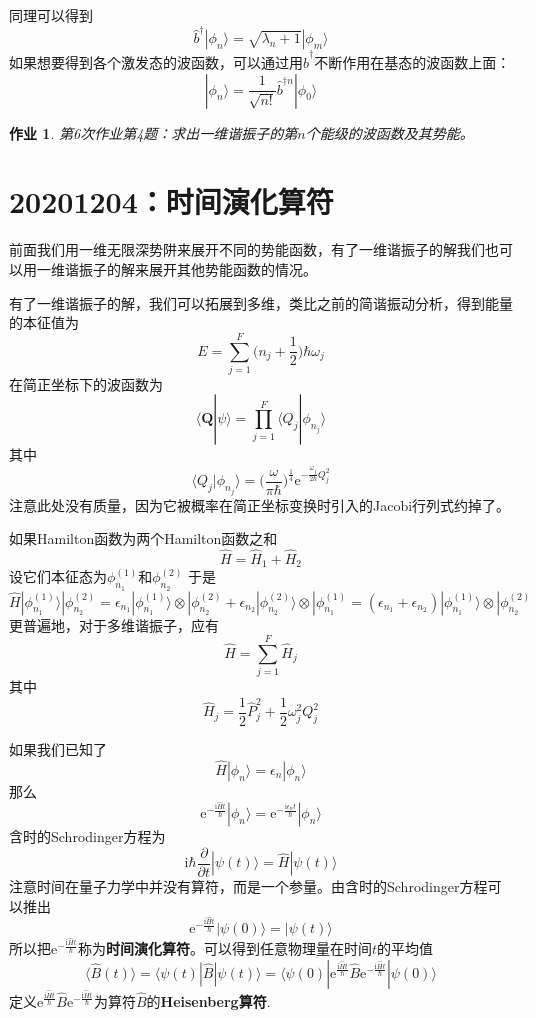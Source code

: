 \documentclass[12pt]{article}
\newtheorem{asg}{作业}
\begin{document}
    同理可以得到
    \[ \hat{b}^\dagger|\phi_n\rangle = \sqrt{\lambda_n+1}|\phi_m\rangle \]
    如果想要得到各个激发态的波函数，可以通过用$\hat{b}^\dagger$不断作用在基态的波函数上面：
    \[ |\phi_n \rangle = \frac 1{\sqrt{n!}} \hat{b}^{\dagger n} | \phi_0 \rangle \]

    \begin{asg}
        第6次作业第4题：求出一维谐振子的第$n$个能级的波函数及其势能。
    \end{asg}

\section{20201204：时间演化算符}

    前面我们用一维无限深势阱来展开不同的势能函数，有了一维谐振子的解我们也可以用一维谐振子的解来展开其他势能函数的情况。

    有了一维谐振子的解，我们可以拓展到多维，类比之前的简谐振动分析，得到能量的本征值为
    \[ E = \sum_{j=1}^F \bigg(n_j+\frac 12\bigg)\hbar \omega_j \]
    在简正坐标下的波函数为
    \[ \langle \bm{Q}|\psi \rangle = \prod_{j=1}^F \langle Q_j | \phi_{n_j} \rangle \]
    其中
    \[ \langle Q_j|\phi_{n_j} \rangle = \bigg(\frac {\omega}{\pi \hbar}\bigg)^{\frac 14} \mathrm{e}^{-\frac {\omega_j}{2\hbar} Q_j^2} \]
    注意此处没有质量，因为它被概率在简正坐标变换时引入的Jacobi行列式约掉了。

    如果Hamilton函数为两个Hamilton函数之和
    \[ \hat{H} = \hat{H}_1 + \hat{H}_2 \]
    设它们本征态为$\phi_{n_1}^{(1)}$和$\phi_{n_2}^{(2)}$
    于是
    \[\hat{H} |\phi_{n_1}^{(1)} \rangle |\phi_{n_2}^{(2)} = \epsilon_{n_1}|\phi_{n_1}^{(1)} \rangle \otimes |\phi_{n_2}^{(2)} + \epsilon_{n_2}|\phi_{n_2}^{(2)} \rangle \otimes |\phi_{n_1}^{(1)} = (\epsilon_{n_1}+\epsilon_{n_2})|\phi_{n_1}^{(1)} \rangle \otimes |\phi_{n_2}^{(2)}\]
    更普遍地，对于多维谐振子，应有
    \[ \hat{H} = \sum_{j=1}^F \hat{H}_j \]
    其中 
    \[ \hat{H}_j = \frac 12 \hat{P}_j^2 + \frac 12 \omega_j^2 Q_j^2 \]

    如果我们已知了
    \[ \hat{H}|\phi_n\rangle = \epsilon_n|\phi_n\rangle \]
    那么
    \[ \mathrm{e}^{-\frac {\mathrm{i}\hat{H}t}{\hbar}}|\phi_n\rangle = \mathrm{e}^{-\frac {\mathrm{i}\epsilon_n t}{\hbar}}|\phi_n\rangle \]
    含时的Schrodinger方程为
    \[ \mathrm{i}\hbar \frac {\partial}{\partial t}|\psi(t)\rangle = \hat{H} |\psi(t)\rangle \]
    注意时间在量子力学中并没有算符，而是一个参量。由含时的Schrodinger方程可以推出
    \[ \mathrm{e}^{-\frac {\mathrm{i}\hat{H}t}{\hbar}}|\psi(0)\rangle = |\psi(t) \rangle \]
    所以把$\mathrm{e}^{-\frac {\mathrm{i}\hat{H}t}{\hbar}}$称为\textbf{时间演化算符}。可以得到任意物理量在时间$t$的平均值 
    \[ \langle \hat{B}(t) \rangle = \langle \psi(t)|\hat{B} | \psi(t) \rangle = \langle \psi(0) |\mathrm{e}^{\frac {\mathrm{i}\hat{H}t}{\hbar}} \hat{B} \mathrm{e}^{-\frac {\mathrm{i}\hat{H}t}{\hbar}}|\psi(0) \rangle \]
    定义$\mathrm{e}^{\frac {\mathrm{i}\hat{H}t}{\hbar}} \hat{B} \mathrm{e}^{-\frac {\mathrm{i}\hat{H}t}{\hbar}}$为算符$\hat{B}$的\textbf{Heisenberg算符}.
\end{document}
